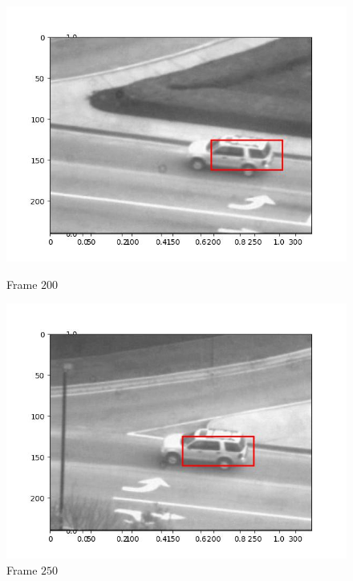 \begin{figure}[H]
\begin{minipage}{.49\textwidth}
    \includegraphics[width=\textwidth]{./figures/lk/car2/frame000200.jpg}
    \caption{Frame $200$}
  \end{minipage}
  \hfill
  \begin{minipage}{.49\textwidth}
    \centering
    \includegraphics[width=\textwidth]{./figures/lk/car2/frame000250.jpg}
    \caption{Frame $250$}
  \end{minipage}
\end{figure}
